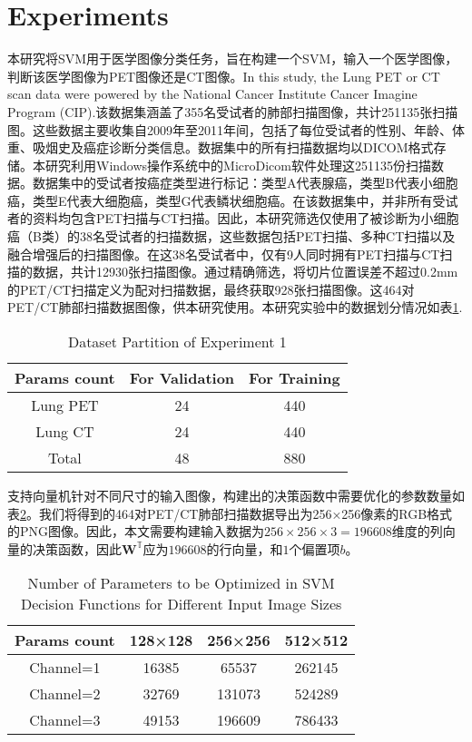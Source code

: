 \documentclass[twocolumn]{article}
\begin{document}
\section{Experiments}
本研究将SVM用于医学图像分类任务，旨在构建一个SVM，输入一个医学图像，判断该医学图像为PET图像还是CT图像。In this study, the Lung PET or CT scan data\cite{li_large-scale_2020} were powered by the National Cancer Institute Cancer Imagine Program (CIP).该数据集涵盖了355名受试者的肺部扫描图像，共计251135张扫描图。这些数据主要收集自2009年至2011年间，包括了每位受试者的性别、年龄、体重、吸烟史及癌症诊断分类信息。数据集中的所有扫描数据均以DICOM格式存储。本研究利用Windows操作系统中的MicroDicom软件处理这251135份扫描数据。数据集中的受试者按癌症类型进行标记：类型A代表腺癌，类型B代表小细胞癌，类型E代表大细胞癌，类型G代表鳞状细胞癌。在该数据集中，并非所有受试者的资料均包含PET扫描与CT扫描。因此，本研究筛选仅使用了被诊断为小细胞癌（B类）的38名受试者的扫描数据，这些数据包括PET扫描、多种CT扫描以及融合增强后的扫描图像。在这38名受试者中，仅有9人同时拥有PET扫描与CT扫描的数据，共计12930张扫描图像。通过精确筛选，将切片位置误差不超过0.2mm的PET/CT扫描定义为配对扫描数据，最终获取928张扫描图像。这464对PET/CT肺部扫描数据图像，供本研究使用。本研究实验中的数据划分情况如表\ref{tab:dataset_partition_1}.

\begin{table}[h]
	\centering
	\caption{Dataset Partition of Experiment 1}
	\label{tab:dataset_partition_1}
	\begin{tabular}{ccc}
		\toprule
		Params count & For Validation & For Training \\
		\midrule
		Lung PET & 24   & 440 \\
		Lung CT  & 24   & 440 \\
		Total    & 48   & 880 \\
		\bottomrule
	\end{tabular}
\end{table}

支持向量机针对不同尺寸的输入图像，构建出的决策函数中需要优化的参数数量如表\ref{tab:params_count}。我们将得到的464对PET/CT肺部扫描数据导出为256×256像素的RGB格式的PNG图像。因此，本文需要构建输入数据为$256 \times 256 \times 3=196608$维度的列向量的决策函数，因此$\mathbf{W}^\mathbb{T}$应为$196608$的行向量，和$1$个偏置项$b$。

\begin{table}[h]
	\centering
	\caption{Number of Parameters to be Optimized in SVM Decision Functions for Different Input Image Sizes}
	\label{tab:params_count}
	\begin{tabular}{cccc}
		\toprule
		Params count & 128×128 & 256×256 & 512×512 \\
		\midrule
		Channel=1    & 16385   & 65537   & 262145  \\
		Channel=2    & 32769   & 131073  & 524289  \\
		Channel=3    & 49153   & 196609  & 786433  \\
		\bottomrule
	\end{tabular}
\end{table}
\end{document}
